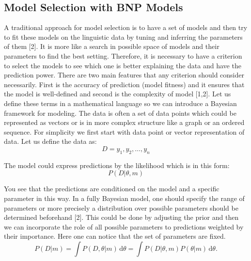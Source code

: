 \subsection{Model Selection with BNP Models}
\label{ssec:model-sel}
A traditional approach for model selection is to have a set of models and then try to fit 
these models on the linguistic data by tuning and inferring the parameters of them [2]. 
It is more like a search in possible space of models and their parameters to find the best setting. 
Therefore, it is necessary to have a criterion to select the models to see which one is better 
explaining the data and have the prediction power. There are two main features that any criterion 
should consider necessarily. First is the accuracy of prediction (model fitness) and it ensures that 
the model is well-defined and second is the complexity of model [1,2]. 
Let us define these terms in a mathematical language so we can introduce a Bayesian framework for modeling. 
The data is often a set of data points which could be represented as vectors or is in more 
complex structure like a graph or an ordered sequence. For simplicity we first start with 
data point or vector representation of data. Let us define the data as:
\begin{equation}
\label{eq:data}
D = y_1,y_2,\ldots,y_n
\end{equation}


The model could express predictions by the likelihood which is in this form:
\begin{equation}
P(D|\theta,m)
\end{equation}

You see that the predictions are conditioned on the model and a specific parameter in this way. 
In a fully Bayesian model, one should specify the range of parameters or more precisely 
a distribution over possible parameters should be determined beforehand [2]. 
This could be done by adjusting the prior and then we can incorporate the role of all possible parameters 
to predictions weighted by their importance. Here one can notice that the set of parameters are fixed.
\begin{equation}
P(D|m) = \int \! P(D,\theta|m) \, \mathrm{d}\theta = \int \!
P(D|\theta,m)P(\theta|m) \, \mathrm{d}\theta.
\end{equation} 

